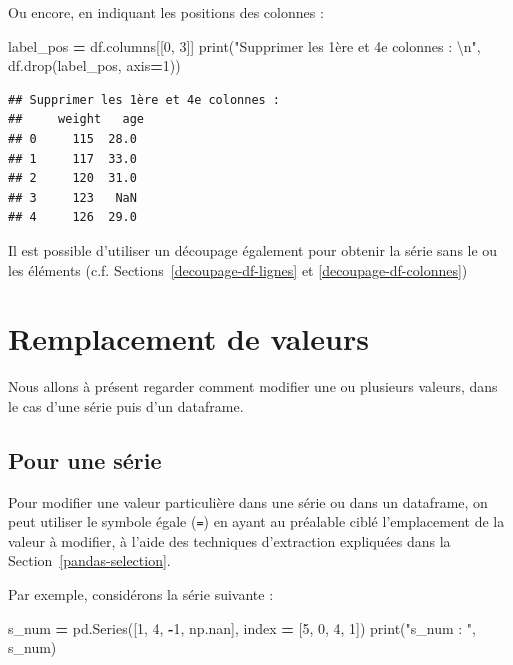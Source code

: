 \documentclass[
  12pt,
]{book}
\newenvironment{Shaded}{\begin{snugshade}}{\end{snugshade}}
\newcommand{\BuiltInTok}[1]{#1}
\newcommand{\CharTok}[1]{\textcolor[rgb]{0.31,0.60,0.02}{#1}}
\newcommand{\DecValTok}[1]{\textcolor[rgb]{0.00,0.00,0.81}{#1}}
\newcommand{\NormalTok}[1]{#1}
\newcommand{\OperatorTok}[1]{\textcolor[rgb]{0.81,0.36,0.00}{\textbf{#1}}}
\newcommand{\StringTok}[1]{\textcolor[rgb]{0.31,0.60,0.02}{#1}}
\numberwithin{equation}{section}
\numberwithin{countremarque}{section}
\begin{document}
Ou encore, en indiquant les positions des colonnes :

\begin{Shaded}
\begin{Highlighting}[]
\NormalTok{label\_pos }\OperatorTok{=}\NormalTok{ df.columns[[}\DecValTok{0}\NormalTok{, }\DecValTok{3}\NormalTok{]]}
\BuiltInTok{print}\NormalTok{(}\StringTok{"Supprimer les 1ère et 4e colonnes :  }\CharTok{\textbackslash{}n}\StringTok{"}\NormalTok{, df.drop(label\_pos, axis}\OperatorTok{=}\DecValTok{1}\NormalTok{))}
\end{Highlighting}
\end{Shaded}

\begin{lstlisting}
## Supprimer les 1ère et 4e colonnes :  
##     weight   age
## 0     115  28.0
## 1     117  33.0
## 2     120  31.0
## 3     123   NaN
## 4     126  29.0
\end{lstlisting}

Il est possible d'utiliser un découpage également pour obtenir la série sans le ou les éléments (c.f. Sections~\ref{decoupage-df-lignes} et \ref{decoupage-df-colonnes})

\section{Remplacement de valeurs}\label{remplacement-de-valeurs}

Nous allons à présent regarder comment modifier une ou plusieurs valeurs, dans le cas d'une série puis d'un dataframe.

\subsection{Pour une série}\label{pour-une-suxe9rie}

Pour modifier une valeur particulière dans une série ou dans un dataframe, on peut utiliser le symbole égale (\texttt{=}) en ayant au préalable ciblé l'emplacement de la valeur à modifier, à l'aide des techniques d'extraction expliquées dans la Section~\ref{pandas-selection}.

Par exemple, considérons la série suivante :

\begin{Shaded}
\begin{Highlighting}[]
\NormalTok{s\_num }\OperatorTok{=}\NormalTok{ pd.Series([}\DecValTok{1}\NormalTok{, }\DecValTok{4}\NormalTok{, }\OperatorTok{{-}}\DecValTok{1}\NormalTok{, np.nan],}
\NormalTok{             index }\OperatorTok{=}\NormalTok{ [}\DecValTok{5}\NormalTok{, }\DecValTok{0}\NormalTok{, }\DecValTok{4}\NormalTok{, }\DecValTok{1}\NormalTok{])}
\BuiltInTok{print}\NormalTok{(}\StringTok{"s\_num : "}\NormalTok{, s\_num)}
\end{Highlighting}
\end{Shaded}
\end{document}
